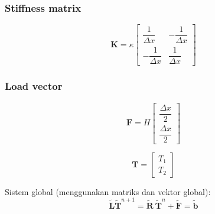 \begin{frame}
\frametitle{Stiffness matrix}
\begin{equation*}
\mathbf{K} = \kappa\begin{bmatrix}
\dfrac{1}{\Delta x} & -\dfrac{1}{\Delta x} \\[0.4cm]
-\dfrac{1}{\Delta x} & \dfrac{1}{\Delta x}
\end{bmatrix}
\end{equation*}

\end{frame}


\begin{frame}
\frametitle{Load vector}

\begin{equation*}
\mathbf{F} = H\begin{bmatrix}
\dfrac{\Delta x}{2} \\
\dfrac{\Delta x}{2}
\end{bmatrix}
\end{equation*}

\end{frame}


\begin{frame}
$$
\mathbf{T} = \begin{bmatrix}
T_1 \\ T_2
\end{bmatrix}
$$
\end{frame}

\begin{frame} %
Sistem global (menggunakan matriks dan vektor global):
$$
\tilde{\mathbf{L}} \tilde{\mathbf{T}}^{n+1} = \tilde{\mathbf{R}}\ 
\tilde{\mathbf{T}}^{n} + \tilde{\mathbf{F}} = \tilde{\mathbf{b}}
$$
\end{frame} %





